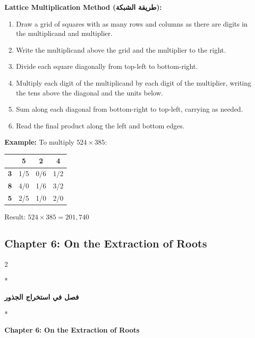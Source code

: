 \documentclass[11pt,a4paper]{article}
\newcommand{\ar}[1]{\arabicfont\beginR #1\endR}
\newenvironment{bilingual}{%
  \vspace{0.3em}%
  \begin{paracol}{2}%
}{%
  \end{paracol}%
  \vspace{0.3em}%
}
\newenvironment{mathalgo}{%
  \par\vspace{0.3cm}
  \begin{framed}
  \setlength{\parindent}{0pt}
}{%
  \end{framed}
  \par\vspace{0.3cm}
}
\begin{document}
\begin{mathalgo}
\textbf{Lattice Multiplication Method (\ar{طريقة الشبكة}):}
\begin{enumerate}[nosep]
  \item Draw a grid of squares with as many rows and columns as there are
  digits in the multiplicand and multiplier.
  \item Write the multiplicand above the grid and the multiplier to the
  right.
  \item Divide each square diagonally from top-left to bottom-right.
  \item Multiply each digit of the multiplicand by each digit of the
  multiplier, writing the tens above the diagonal and the units below.
  \item Sum along each diagonal from bottom-right to top-left, carrying
  as needed.
  \item Read the final product along the left and bottom edges.
\end{enumerate}
\end{mathalgo}

\noindent\textbf{Example:} To multiply $524 \times 385$:

\begin{center}
\begin{tabular}{|c|c|c|c|}
\hline
& \textbf{5} & \textbf{2} & \textbf{4} \\
\hline
\textbf{3} & \multicolumn{1}{c|}{1/5} & \multicolumn{1}{c|}{0/6} & \multicolumn{1}{c|}{1/2} \\
\hline
\textbf{8} & \multicolumn{1}{c|}{4/0} & \multicolumn{1}{c|}{1/6} & \multicolumn{1}{c|}{3/2} \\
\hline
\textbf{5} & \multicolumn{1}{c|}{2/5} & \multicolumn{1}{c|}{1/0} & \multicolumn{1}{c|}{2/0} \\
\hline
\end{tabular}
\end{center}

\noindent Result: $\boxed{524 \times 385 = 201{,}740}$

\subsection{Chapter 6: On the Extraction of Roots}

\begin{bilingual}
\switchcolumn[0]*
\begin{center}
\textbf{\color{chapcolor}\ar{فصل في استخراج الجذور}}
\end{center}
\switchcolumn[1]*
\begin{center}
\textbf{\color{chapcolor}Chapter 6: On the Extraction of Roots}
\end{center}
\end{bilingual}
\end{document}
